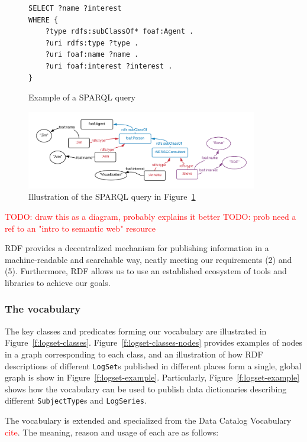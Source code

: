 \begin{figure}[H]
\begin{verbatim}
SELECT ?name ?interest 
WHERE {    
    ?type rdfs:subClassOf* foaf:Agent .
    ?uri rdfs:type ?type .
    ?uri foaf:name ?name .
    ?uri foaf:interest ?interest .
}
\end{verbatim}
\caption{Example of a SPARQL query}
\label{f:sparql}
\end{figure}


\begin{figure}
\includegraphics[width=0.9\textwidth]{sparql.png}
\caption{Illustration of the SPARQL query in Figure~\ref{f:sparql} }
\label{f:sparql-diagram}
\end{figure}

\textcolor{red}{TODO: draw this as a diagram, probably explains it better}
\textcolor{red}{TODO: prob need a ref to an "intro to semantic web" resource}

RDF provides a decentralized mechanism for publishing information in a
machine-readable and searchable way, neatly meeting our requirements
(2) and (5). Furthermore, RDF allows us to use an established ecosystem of 
tools and libraries to achieve our goals.

\subsubsection{The vocabulary}

The key classes and predicates forming our vocabulary are illustrated in 
Figure~\ref{f:logset-classes}. Figure~\ref{f:logset-classes-nodes} provides 
examples of nodes in a graph corresponding to each class, and an 
illustration of how RDF descriptions of different \texttt{LogSet}s published 
in different places form a single, global graph is show in 
Figure~\ref{f:logset-example}. Particularly, Figure~\ref{f:logset-example}
shows how the vocabulary can be used to publish data dictionaries 
describing different \texttt{SubjectType}s and \texttt{LogSeries}.

The vocabulary is extended and specialized 
from the Data Catalog Vocabulary \textcolor{red}{cite}. The meaning, 
reason and usage of each are as follows:

